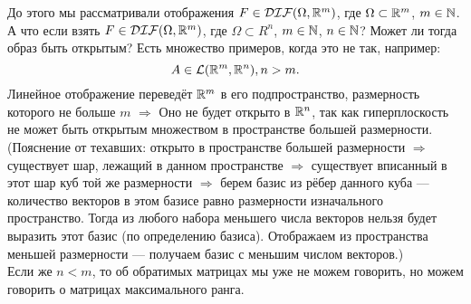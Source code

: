 \begin{question}
До этого мы рассматривали отображения $F \in \mathcal{DIF}(\Omega, \mathbb{R}^m)$, где $\Omega \subset \mathbb{R}^m$, $m \in \mathbb{N}$. А что если взять $F \in \mathcal{DIF}(\Omega, \mathbb{R}^m)$, где $\Omega \subset R^n$, $m\in \mathbb{N}$, $n \in \mathbb{N}$?
Может ли тогда образ быть открытым? Есть множество примеров, когда это не так, например:
$$A \in \mathcal{L}(\mathbb{R}^m, \mathbb{R}^n), n > m.$$
Линейное отображение переведёт $\mathbb{R}^m$ в его подпространство, размерность которого не больше $m$ $\Rightarrow$ Оно не будет открыто в $\mathbb{R}^n$, так как гиперплоскость не может быть открытым множеством в пространстве большей размерности.  \\

(Пояснение от техавших: открыто в пространстве большей размерности $\Rightarrow$ существует шар, лежащий в данном пространстве $\Rightarrow$ существует вписанный в этот шар куб той же размерности $\Rightarrow$ берем базис из рёбер данного куба — количество векторов в этом базисе равно размерности изначального пространство. Тогда из любого набора меньшего числа векторов нельзя будет выразить этот базис (по определению базиса). Отображаем из пространства меньшей размерности — получаем базис с меньшим числом векторов.) \\

Если же $n < m$, то об обратимых матрицах мы уже не можем говорить, но можем говорить о матрицах максимального ранга. 
\end{question}

